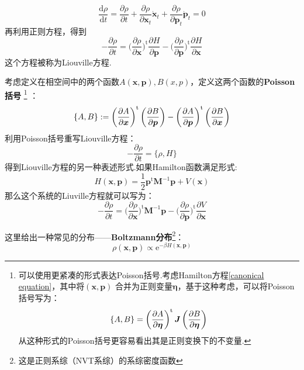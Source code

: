     \begin{equation}
        \frac{\mathrm{d}\rho}{\mathrm{d}t} = \frac {\partial \rho}{\partial t} + \frac {\partial \rho}{\partial \bm{x}_t}\dot{\bm{x}}_t  + \frac {\partial \rho}{\partial \bm{p}_t} \dot{\bm{p}}_t = 0
    \end{equation}
    再利用正则方程，得到
    \begin{equation}
        - \frac {\partial \rho}{\partial t} = \bigg(\frac {\partial \rho}{\partial \bm{x}}\bigg)^\mathrm{t} \frac {\partial H}{\partial \bm{p}} - 
        \bigg(\frac {\partial \rho}{\partial \bm{p}}\bigg)^\mathrm{t} \frac {\partial H}{\partial \bm{x}}
        \label{Liouville equation Euler}
    \end{equation}
    这个方程被称为Liouville方程.
    \par 
    考虑定义在相空间中的两个函数$A(\bm{x}, \bm{p}),B(x ,p)$，定义这两个函数的\textbf{Poisson括号}
    \footnote{
        可以使用更紧凑的形式表达Poisson括号.考虑Hamilton方程\ref{canonical equation}，其中将$(\bm{x}, \bm{p})$
        合并为正则变量$\bm{\eta}$，基于这种考虑，可以将Poisson括号写为：
        \begin{equation}
            \{A, B\} = \left(\frac{\partial{A}}{\partial{\bm{\eta}}}\right)^{\mathrm{t}}\bm{J}\left(\frac{\partial{B}}{\partial{\bm{\eta}}}\right)
        \end{equation}
        从这种形式的Poisson括号更容易看出其是正则变换下的不变量.
    }
    ：
    \begin{equation}
        \{A, B\} := \left(\frac{\partial{A}}{\partial{\bm{x}}}\right)^{\mathrm{t}}\left(\frac{\partial{B}}{\partial{\bm{p}}}\right) - \left(\frac{\partial{A}}{\partial{\bm{p}}}\right)^{\mathrm{t}}\left(\frac{\partial{B}}{\partial{\bm{x}}}\right)
    \end{equation}
    利用Poisson括号重写Liouville方程：
    \begin{equation}
        - \frac {\partial \rho}{\partial t} = \{ \rho, H\}
    \end{equation}
    得到Liouville方程的另一种表述形式.如果Hamilton函数满足形式:
    \begin{equation}
        H(\bm{x},\bm{p}) = \frac{1}{2}\bm{p}^\mathrm{t} \bm{M}^{-1} \bm{p} + V(\bm{x})
    \end{equation}
    那么这个系统的Liuville方程就可以写为：
    \begin{equation} 
        - \frac {\partial \rho}{\partial t} = \bigg(\frac {\partial \rho}{\partial \bm{x}}\bigg)^\mathrm{t} \bm{M}^{-1} \bm{p}
         - \bigg(\frac {\partial \rho}{\partial \bm{p}}\bigg)^\mathrm{t} \frac {\partial V}{\partial \bm{x}}
    \end{equation}
    \par
    这里给出一种常见的分布——\textbf{Boltzmann分布}\footnote{这是正则系综（NVT系综）的系综密度函数}：
    \begin{equation}
        \rho(\bm{x},\bm{p}) \propto \mathrm{e}^{-\beta H(\bm{x},\bm{p})}
    \end{equation}

